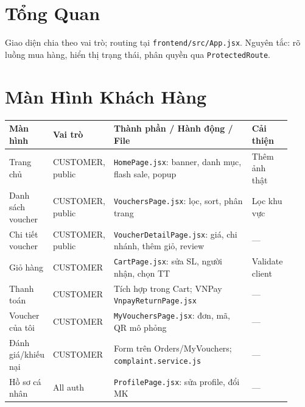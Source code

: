 \section{Tổng Quan}
Giao diện chia theo vai trò; routing tại \texttt{frontend/src/App.jsx}. Nguyên tắc: rõ luồng mua hàng, hiển thị trạng thái, phân quyền qua \texttt{ProtectedRoute}.

\section{Màn Hình Khách Hàng}
\small
\begin{longtable}{>{\raggedright\arraybackslash}p{0.14\linewidth}>{\raggedright\arraybackslash}p{0.12\linewidth}>{\raggedright\arraybackslash}p{0.52\linewidth}>{\raggedright\arraybackslash}p{0.14\linewidth}}
\toprule
\textbf{Màn hình} & \textbf{Vai trò} & \textbf{Thành phần / Hành động / File} & \textbf{Cải thiện}\\
\midrule
\endhead
Trang chủ & CUSTOMER, public & \texttt{HomePage.jsx}: banner, danh mục, flash sale, popup & Thêm ảnh thật\\
Danh sách voucher & CUSTOMER, public & \texttt{VouchersPage.jsx}: lọc, sort, phân trang & Lọc khu vực\\
Chi tiết voucher & CUSTOMER, public & \texttt{VoucherDetailPage.jsx}: giá, chi nhánh, thêm giỏ, review & —\\
Giỏ hàng & CUSTOMER & \texttt{CartPage.jsx}: sửa SL, người nhận, chọn TT & Validate client\\
Thanh toán & CUSTOMER & Tích hợp trong Cart; VNPay \texttt{VnpayReturnPage.jsx} & —\\
Voucher của tôi & CUSTOMER & \texttt{MyVouchersPage.jsx}: đơn, mã, QR mô phỏng & —\\
Đánh giá/khiếu nại & CUSTOMER & Form trên Orders/MyVouchers; \texttt{complaint.service.js} & —\\
Hồ sơ cá nhân & All auth & \texttt{ProfilePage.jsx}: sửa profile, đổi MK & —\\
\bottomrule
\end{longtable}
\normalsize

